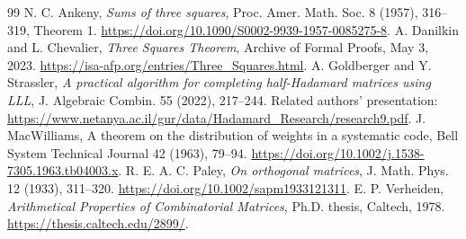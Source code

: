 \documentclass[11pt]{article}
\begin{document}





\begin{thebibliography}{99}
 N. C. Ankeny, \emph{Sums of three squares},
Proc. Amer. Math. Soc. 8 (1957), 316--319, Theorem 1.
\url{https://doi.org/10.1090/S0002-9939-1957-0085275-8}.
 A. Danilkin and L. Chevalier,
\emph{Three Squares Theorem}, Archive of Formal Proofs, May 3, 2023.
\url{https://isa-afp.org/entries/Three_Squares.html}.
 A. Goldberger and Y. Strassler, \emph{A practical algorithm
for completing half-Hadamard matrices using LLL}, J. Algebraic Combin.
55 (2022), 217--244. Related authors' presentation:
\url{https://www.netanya.ac.il/gur/data/Hadamard_Research/research9.pdf}.
 J. MacWilliams, A theorem on the distribution of weights
in a systematic code, Bell System Technical Journal 42 (1963),
79--94. \url{https://doi.org/10.1002/j.1538-7305.1963.tb04003.x}.
 R. E. A. C. Paley, \emph{On orthogonal matrices},
J. Math. Phys. 12 (1933), 311--320.
\url{https://doi.org/10.1002/sapm1933121311}.
 E. P. Verheiden, \emph{Arithmetical Properties of
Combinatorial Matrices}, Ph.D. thesis, Caltech, 1978.
\url{https://thesis.caltech.edu/2899/}.
\end{thebibliography}
\end{document}
